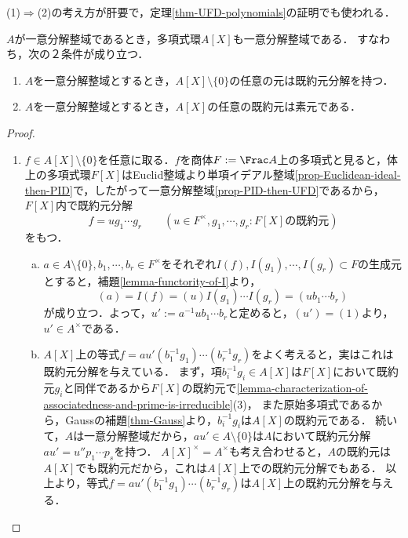 \documentclass[uplatex,dvipdfmx]{jsreport}
\begin{document}
\begin{remarks}
    (1)$\Rightarrow$(2)の考え方が肝要で，定理\ref{thm-UFD-polynomials}の証明でも使われる．
\end{remarks}

\begin{theorem}\label{thm-UFD-polynomials}
    $A$が一意分解整域であるとき，多項式環$A[X]$も一意分解整域である．
    すなわち，次の２条件が成り立つ．
    \begin{enumerate}
        \item $A$を一意分解整域とするとき，$A[X]\setminus\{0\}$の任意の元は既約元分解を持つ．
        \item $A$を一意分解整域とするとき，$A[X]$の任意の既約元は素元である．
    \end{enumerate}
\end{theorem}
\begin{proof}\mbox{}
    \begin{enumerate}
        \item $f\in A[X]\setminus\{0\}$を任意に取る．$f$を商体$F:=\Frac A$上の多項式と見ると，体上の多項式環$F[X]$はEuclid整域より単項イデアル整域\ref{prop-Euclidean-ideal-then-PID}で，したがって一意分解整域\ref{prop-PID-then-UFD}であるから，
        $F[X]$内で既約元分解
        \[f=ug_1\cdots g_r\qquad(u\in F^\times,g_1,\cdots,g_r:F[X]の既約元)\]
        をもつ．
        \begin{enumerate}[(a)]
            \item $a\in A\setminus\{0\},b_1,\cdots,b_r\in F^\times$をそれぞれ$I(f),I(g_1),\cdots,I(g_r)\subset F$の生成元とすると，補題\ref{lemma-functority-of-I}より，
            \[(a)=I(f)=(u)I(g_1)\cdots I(g_r)=(ub_1\cdots b_r)\]
            が成り立つ．よって，$u':=a^{-1}ub_1\cdots b_r$と定めると，$(u')=(1)$より，$u'\in A^\times$である．
            \item $A[X]$上の等式$f=au'(b_1^{-1}g_1)\cdots(b_r^{-1}g_r)$をよく考えると，実はこれは既約元分解を与えている．
            まず，項$b_i^{-1}g_i\in A[X]$は$F[X]$において既約元$g_i$と同伴であるから$F[X]$の既約元で\ref{lemma-characterization-of-associatedness-and-prime-is-irreducible}(3)，
            また原始多項式であるから，Gaussの補題\ref{thm-Gauss}より，$b^{-1}_ig_i$は$A[X]$の既約元である．
            続いて，$A$は一意分解整域だから，$au'\in A\setminus\{0\}$は$A$において既約元分解$au'=u''p_1\cdots p_s$を持つ．
            $A[X]^\times=A^\times$も考え合わせると，$A$の既約元は$A[X]$でも既約元だから，これは$A[X]$上での既約元分解でもある．
            以上より，等式$f=au'(b_1^{-1}g_1)\cdots(b_r^{-1}g_r)$は$A[X]$上の既約元分解を与える．

\end{enumerate}
\end{enumerate}
\end{proof}
\end{document}
